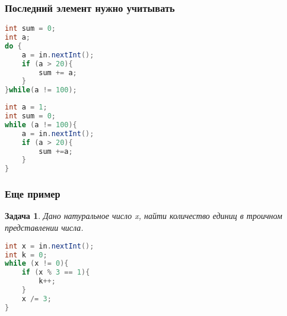 \documentclass{article}
\newtheorem{task}{Задача}
\begin{document}
\subsubsection{Последний элемент нужно учитывать}
\begin{lstlisting}[language=Java] 
int sum = 0;
int a;
do {
    a = in.nextInt();
    if (a > 20){
        sum += a;
    }
}while(a != 100);
\end{lstlisting} 
\begin{lstlisting}[language=Java] 
int a = 1;
int sum = 0;
while (a != 100){
    a = in.nextInt();
    if (a > 20){
        sum +=a;
    }
} 
\end{lstlisting} 
\subsubsection{Еще пример}
\begin{task}
    Дано натуральное число x, найти количество единиц в троичном представлении числа.
\end{task}
\begin{lstlisting}[language=Java] 
int x = in.nextInt();
int k = 0;
while (x != 0){
    if (x % 3 == 1){
        k++;
    }
    x /= 3;
}
\end{lstlisting} 
\end{document}
